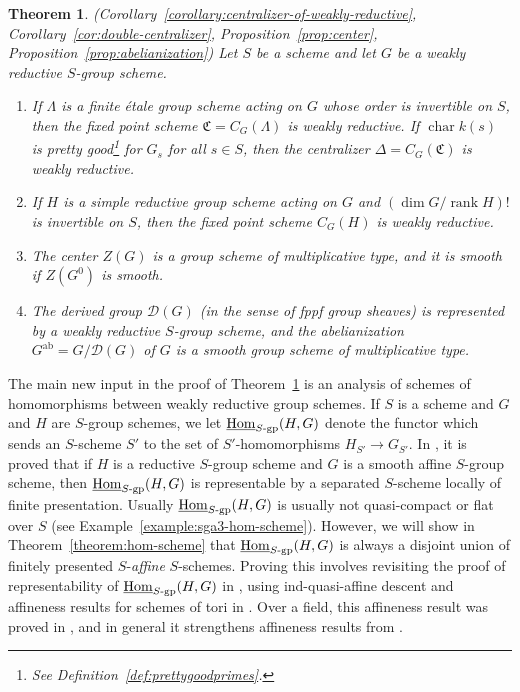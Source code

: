\documentclass[11pt, letterpaper,english]{amsart}
\theoremstyle{plain}
\newtheorem{theorem}[lem]{Theorem}
\theoremstyle{definition}
\numberwithin{equation}{section}
\numberwithin{lem}{section}
\newcommand{\fC}{\mathfrak{C}}
\newcommand{\sD}{{\mathscr D}}
\DeclareMathOperator{\Hom}{Hom}
\DeclareMathOperator{\rank}{rank}
\DeclareMathOperator{\chara} {char}
\begin{document}
\begin{theorem}\label{theorem:intro-wr} (Corollary~\ref{corollary:centralizer-of-weakly-reductive}, Corollary~\ref{cor:double-centralizer}, Proposition~\ref{prop:center}, Proposition~\ref{prop:abelianization})
    Let $S$ be a scheme and let $G$ be a weakly reductive $S$-group scheme.
\begin{enumerate}
    \item If $\Lambda$ is a finite \'etale group scheme acting on $G$ whose order is invertible on $S$, then the fixed point scheme $\fC = C_G(\Lambda)$ is weakly reductive. If $\chara k(s)$ is pretty good\footnote{See Definition~\ref{def:prettygoodprimes}.} for $G_s$ for all $s \in S$, then the centralizer $\Delta = C_G(\fC)$ is weakly reductive.
    \item If $H$ is a simple reductive group scheme acting on $G$ and $(\dim G/\rank H)!$ is invertible on $S$, then the fixed point scheme $C_G(H)$ is weakly reductive.
    \item The center $Z(G)$ is a group scheme of multiplicative type, and it is smooth if $Z(G^0)$ is smooth.
    \item The derived group $\sD(G)$ (in the sense of fppf group sheaves) is represented by a weakly reductive $S$-group scheme, and the abelianization $G^{\mathrm{ab}} = G/\sD(G)$ of $G$ is a smooth group scheme of multiplicative type.
\end{enumerate}
\end{theorem}

The main new input in the proof of Theorem~\ref{theorem:intro-wr} is an analysis of schemes of homomorphisms between weakly reductive group schemes. If $S$ is a scheme and $G$ and $H$ are $S$-group schemes, we let $\underline{\Hom}_{S\textrm{-}\rm{gp}}(H, G)$ denote the functor which sends an $S$-scheme $S'$ to the set of $S'$-homomorphisms $H_{S'} \to G_{S'}$. In \cite[Exp.\ XXIV, Corollaire 7.2.3]{sga3}, it is proved that if $H$ is a reductive $S$-group scheme and $G$ is a smooth affine $S$-group scheme, then $\underline{\Hom}_{S\textrm{-}\rm{gp}}(H, G)$ is representable by a separated $S$-scheme locally of finite presentation. Usually $\underline{\Hom}_{S\textrm{-}\rm{gp}}(H, G)$ is usually not quasi-compact or flat over $S$ (see Example~\ref{example:sga3-hom-scheme}). However, we will show in Theorem~\ref{theorem:hom-scheme} that $\underline{\Hom}_{S\textrm{-}\rm{gp}}(H, G)$ is always a disjoint union of finitely presented $S$-\textit{affine} $S$-schemes. Proving this involves revisiting the proof of representability of $\underline{\Hom}_{S\textrm{-}\rm{gp}}(H, G)$ in \cite{sga3}, using ind-quasi-affine descent and affineness results for schemes of tori in \cite{Faisceaux-amples}. Over a field, this affineness result was proved in \cite[Theorem 6.3]{Brion}, and in general it strengthens affineness results from \cite[Theorem 3.1.4]{Romagny}. 
\end{document}
